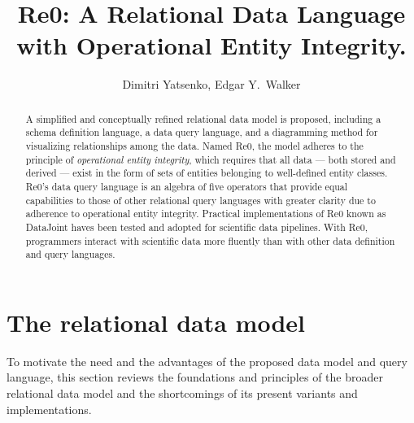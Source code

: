 \documentclass[letter,10pt]{article}
\title{Re0: A Relational Data Language with Operational Entity Integrity.}
\author{Dimitri Yatsenko, Edgar Y.\ Walker}
\begin{document}
\maketitle
\begin{abstract}
A simplified and conceptually refined relational data model is proposed, including a schema definition language, a data query language, and a diagramming method for visualizing relationships among the data.  
Named Re0, the model adheres to the principle of \emph{operational entity integrity}, which requires that all data --- both stored and derived --- exist in the form of sets of entities belonging to well-defined entity classes.  
Re0's data query language is an algebra of five operators that provide equal capabilities to those of other relational query languages with greater clarity due to adherence to operational entity integrity. 
Practical implementations of Re0 known as DataJoint haves been tested and adopted for scientific data pipelines.  
With Re0, programmers interact with scientific data more fluently than with other data definition and query languages.
\end{abstract}
\tableofcontents 

\twocolumn

\section{The relational data model}
To motivate the need and the advantages of the proposed data model and query language, this section reviews the foundations and principles of the broader relational data model and the shortcomings of its present variants and implementations. 
\end{document}
